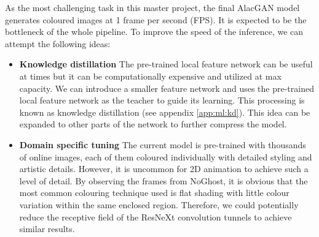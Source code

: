 As the most challenging task in this master project, the final AlacGAN model generates coloured images at 1 frame per second (FPS). It is expected to be the bottleneck of the whole pipeline. To improve the speed of the inference, we can attempt the following ideas:

\begin{itemize}
    \item \textbf{Knowledge distillation} The pre-trained local feature network can be useful at times but it can be computationally expensive and utilized at max capacity. We can introduce a smaller feature network and uses the pre-trained local feature network as the teacher to guide its learning. This processing is known as knowledge distillation (see appendix \ref{app:ml:kd}). This idea can be expanded to other parts of the network to further compress the model.
    \item \textbf{Domain specific tuning} The current model is pre-trained with thousands of online images, each of them coloured individually with detailed styling and artistic details. However, it is uncommon for 2D animation to achieve such a level of detail. By observing the frames from NoGhost, it is obvious that the most common colouring technique used is flat shading with little colour variation within the same enclosed region. Therefore, we could potentially reduce the receptive field of the ResNeXt convolution tunnels to achieve similar results.
\end{itemize}

